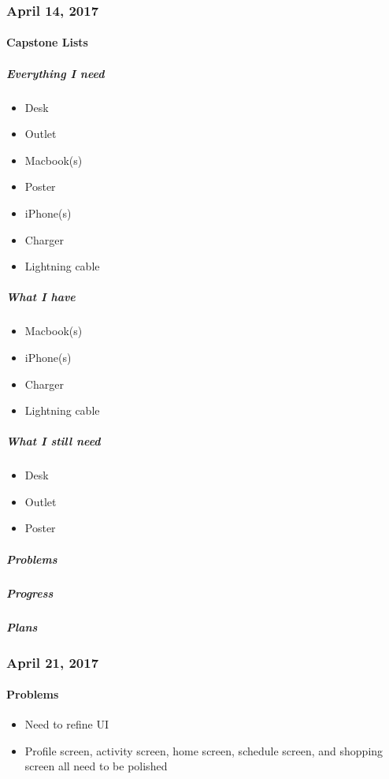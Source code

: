 \subsubsection{April 14, 2017}\label{section}
\paragraph{Capstone Lists}\label{capstone-lists}
\subparagraph{Everything I need}\label{everything-i-need}
\begin{itemize}
\tightlist
\item
  Desk
\item
  Outlet
\item
  Macbook(s)
\item
  Poster
\item
  iPhone(s)
\item
  Charger
\item
  Lightning cable
\end{itemize}
\subparagraph{What I have}\label{what-i-have}
\begin{itemize}
\tightlist
\item
  Macbook(s)
\item
  iPhone(s)
\item
  Charger
\item
  Lightning cable
\end{itemize}
\subparagraph{What I still need}\label{what-i-still-need}
\begin{itemize}
\tightlist
\item
  Desk
\item
  Outlet
\item
  Poster
\end{itemize}
\subparagraph{Problems}\label{problems}
\subparagraph{Progress}\label{progress}
\subparagraph{Plans}\label{plans}

\subsubsection{April 21, 2017}\label{section}
\paragraph{Problems}\label{problems}
\begin{itemize}
\tightlist
\item
  Need to refine UI
\item
  Profile screen, activity screen, home screen, schedule screen, and
  shopping screen all need to be polished
\end{itemize}

